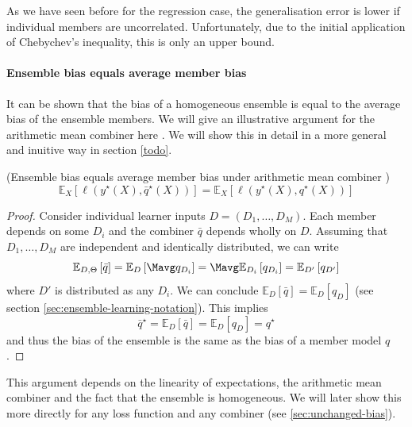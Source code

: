 \documentclass[
    a4paper, %
	fontsize=10pt, %
	twoside=false, %
]{kaobook}
\begin{document}
\begin{titlepage}
As we have seen before for the regression case, the generalisation error is lower if individual members are uncorrelated. Unfortunately, due to the initial application of Chebychev's inequality, this is only an upper bound. 

\paragraph{Ensemble bias equals average member bias}
It can be shown that the bias of a homogeneous ensemble is equal to the average bias of the ensemble members. We will give an illustrative argument for the arithmetic mean combiner here
.
We will show this in detail in a more general and inuitive way in section \ref{todo}.

\begin{lemma} (Ensemble bias equals average member bias under arithmetic mean combiner \cite{louppe_UnderstandingRandomForests_2015})
  \label{thm:ensemble-bias-equals-average-bias}
$$
\mathbb{E}_{X}\left[ \ell(y^\star(X), \bar{q}^\star(X)) \right] 
= \mathbb{E}_{X}\left[ \ell(y^\star(X), q^\star(X)) \right] 
$$
\end{lemma}
\begin{proof}
Consider individual learner inputs $D = (D_{1}, \dots, D_{M})$. Each member depends on some $D_{i}$ and the combiner $\bar{q}$ depends wholly on $D$. Assuming that $D_{1}, \dots, D_{M}$ are independent and identically distributed, we can write
$$
\mathbb{E}_{D, \Theta}\left[ \bar{q} \right] = \mathbb{E}_{D}\left[ \Mavg q_{D_{i}} \right] = \Mavg \mathbb{E}_{D_{i}}\left[ q_{D_{i}} \right] = \mathbb{E}_{D'}\left[ q_{D'} \right]
$$
where $D'$ is distributed as any $D_{i}$. We can conclude $\mathbb{E}_{D}\left[ \bar{q} \right] = \mathbb{E}_{D}\left[ q_{D} \right]$ (see section \ref{sec:ensemble-learning-notation}).
This implies
$$
\bar{q}^\star = \mathbb{E}_{D}\left[ \bar{q} \right]  = \mathbb{E}_{D}\left[ q_{D} \right]  = q^\star
$$
and thus the bias of the ensemble is the same as the bias of a member model $q$.
\end{proof}
This argument depends on the linearity of expectations, the arithmetic mean combiner and the fact that the ensemble is homogeneous. We will later show this more directly for any loss function and any combiner (see \ref{sec:unchanged-bias}).


\end{titlepage}
\end{document}

